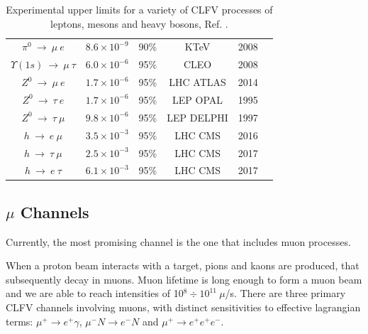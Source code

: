 \begin{center}
\begin{table}[!h]
\begin{tabular}{c c c c c c}
$\pi^0 \ \rightarrow \ \mu \ e$ & $8.6 \times 10^{-9}$ & 90\% & KTeV & 2008 & \cite{KTeV:2007cvy}\\
$\Upsilon (1s) \ \rightarrow \ \mu \ \tau $ & $6.0 \times 10^{-6}$ & 95\% & CLEO & 2008 & \cite{Love_2008}\\
\hline
$Z^0 \ \rightarrow \ \mu \ e$ & $1.7 \times 10^{-6}$ & 95\% &  LHC ATLAS & 2014 & \cite{Aad_2014} \\
$Z^0 \ \rightarrow \ \tau \ e$ & $1.7 \times 10^{-6}$ & 95\% &  LEP OPAL & 1995 & \cite{akers}\\
$Z^0 \ \rightarrow \ \tau \ \mu$ & $9.8 \times 10^{-6}$ & 95\% &  LEP DELPHI & 1997 & \cite{abreu}\\
$h \ \rightarrow \ e \ \mu$ & $3.5 \times 10^{-3}$ & 95\% & LHC CMS & 2016 & \cite{PhysRevD.104.032013}\\
$h \ \rightarrow \ \tau  \ \mu$ & $2.5 \times 10^{-3}$ & 95\% & LHC CMS & 2017 & \cite{cms17}\\
$h \ \rightarrow \ e \ \tau$ & $6.1 \times 10^{-3}$ & 95\% & LHC CMS & 2017 & \cite{cms17}\\
\hline
\end{tabular}
\caption{Experimental upper limits for a variety of CLFV processes of leptons, mesons and heavy bosons, Ref. \cite{clfv_signorelli}.}
\label{tab:upperlimits}
\end{table}
\end{center}
\vspace{-15mm}
\subsection{$\mu$ Channels}
Currently, the most promising channel is the one that includes muon processes.


When a proton beam interacts with a target, 
pions and kaons are produced, that subsequently decay in muons. Muon lifetime is long enough to form a muon beam and we are able to reach 
intensities of 10$^8 \div 10^{11} \  \mu$/s. There are three primary CLFV channels involving muons, with distinct sensitivities to effective lagrangian 
terms: $\mu^+ \rightarrow e^+ \gamma$, $\mu^- N \rightarrow e^- N$ and $\mu^+ \rightarrow e^+ e^+ e^-$.



